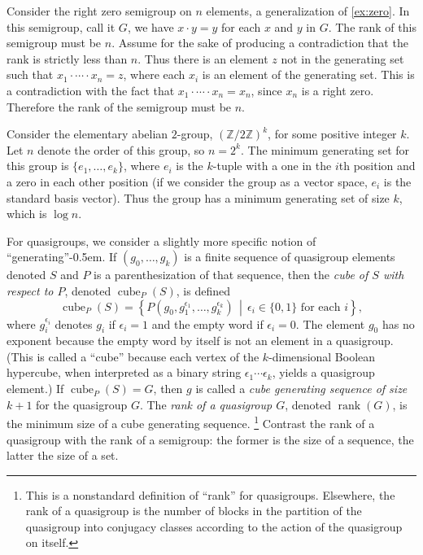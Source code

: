 \documentclass{article}
\DeclareMathOperator{\cube}{cube}
\DeclareMathOperator{\rank}{rank}
\begin{document}
\begin{example}\label{ex:semigroupgen}
  Consider the right zero semigroup on $n$ elements, a generalization of \autoref{ex:zero}.
  In this semigroup, call it $G$, we have $x \cdot y = y$ for each $x$ and $y$ in $G$.
  The rank of this semigroup must be $n$.
  Assume for the sake of producing a contradiction that the rank is strictly less than $n$.
  Thus there is an element $z$ not in the generating set such that $x_1 \cdot \dotsb \cdot x_n = z$, where each $x_i$ is an element of the generating set.
  This is a contradiction with the fact that $x_1 \cdot \dotsb \cdot x_n = x_n$, since $x_n$ is a right zero.
  Therefore the rank of the semigroup must be $n$.
\end{example}

\begin{example}\label{ex:elementary}
  Consider the elementary abelian $2$-group, $(\mathbb{Z} / 2 \mathbb{Z})^k$, for some positive integer $k$.
  Let $n$ denote the order of this group, so $n = 2^k$.
  The minimum generating set for this group is $\{e_1, \dotsc, e_k\}$, where $e_i$ is the $k$-tuple with a one in the $i$th position and a zero in each other position (if we consider the group as a vector space, $e_i$ is the standard basis vector).
  Thus the group has a minimum generating set of size $k$, which is $\log n$.
\end{example}

For quasigroups, we consider a slightly more specific notion of ``generating''\kern-0.5em.
If $(g_0, \dotsc, g_k)$ is a finite sequence of quasigroup elements denoted $S$ and $P$ is a parenthesization of that sequence, then the \emph{cube of $S$ with respect to $P$}, denoted $\cube_P(S)$, is defined
\begin{equation*}
  \cube_P(S) = \left\{P(g_0, g_1^{\epsilon_1}, \dotsc, g_k^{\epsilon_k}) \, \middle| \, \epsilon_i \in \{0, 1\} \text{ for each } i \right\},
\end{equation*}
where $g_i^{\epsilon_i}$ denotes $g_i$ if $\epsilon_i = 1$ and the empty word if $\epsilon_i = 0$.
The element $g_0$ has no exponent because the empty word by itself is not an element in a quasigroup.
(This is called a ``cube'' because each vertex of the $k$-dimensional Boolean hypercube, when interpreted as a binary string $\epsilon_1 \dotsb \epsilon_k$, yields a quasigroup element.)
If $\cube_P(S) = G$, then $g$ is called a \emph{cube generating sequence of size $k + 1$} for the quasigroup $G$.
The \emph{rank of a quasigroup $G$}, denoted $\rank(G)$, is the minimum size of a cube generating sequence.%
\footnote{
  This is a nonstandard definition of ``rank'' for quasigroups.
  Elsewhere, the rank of a quasigroup is the number of blocks in the partition of the quasigroup into conjugacy classes according to the action of the quasigroup on itself.
}
Contrast the rank of a quasigroup with the rank of a semigroup: the former is the size of a sequence, the latter the size of a set.
\end{document}
